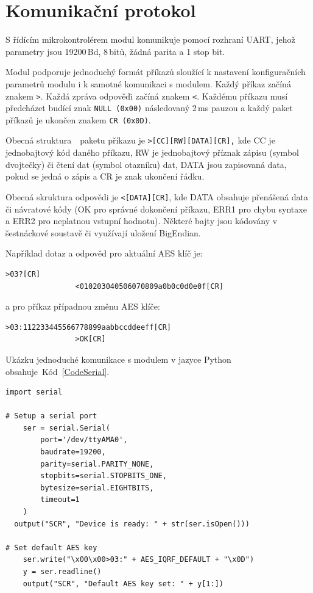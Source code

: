 \section{Komunikační protokol}

S řídícím mikrokontrolérem modul komunikuje pomocí rozhraní UART, jehož parametry jsou 19200\,Bd, 8\,bitů, žádná parita a 1 stop bit.
		
Modul podporuje jednoduchý formát příkazů sloužící k nastavení konfiguračních parametrů modulu i k samotné komunikaci s modulem. Každý příkaz začíná znakem \texttt{\textgreater}. Každá zpráva odpověďi začíná znakem \texttt{\textless}. Každému příkazu musí předcházet budící znak \texttt{NULL (0x00)} následovaný 2\,ms pauzou a každý paket příkazů je ukončen znakem \texttt{CR (0x0D)}. 

Obecná struktura~\cite{ModulIQRF}~paketu příkazu je	\texttt{>[CC][RW][DATA][CR],} kde CC je jednobajtový kód daného příkazu, RW je jednobajtový příznak zápisu (symbol dvojtečky) či čtení dat (symbol otazníku) dat, DATA jsou zapisovaná data, pokud se jedná o zápis a CR je znak ukončení řádku.

Obecná skruktura odpovědi je \texttt{<[DATA][CR]}, kde DATA obsahuje přenášená data či návratové kódy (OK pro správné dokončení příkazu, ERR1 pro chybu syntaxe a ERR2 pro neplatnou vstupní hodnotu). Některé bajty jsou kódovány v šestnáckové soustavě či využívají uložení BigEndian.

Například dotaz a odpověd pro aktuální AES klíč je:
\label{KapitolaStazeniKlice}

\begin{lstlisting}[style=MyCodeBash]
				>03?[CR]
				<010203040506070809a0b0c0d0e0f[CR]  
\end{lstlisting}

a pro příkaz případnou změnu AES klíče:

\begin{lstlisting}[style=MyCodeBash]
				>03:112233445566778899aabbccddeeff[CR]
				>OK[CR]
\end{lstlisting}

Ukázku jednoduché komunikace s modulem v jazyce Python obsahuje~Kód~\ref{CodeSerial}.

\begin{lstlisting}[caption={Komunikace s modulem přes sériový port},captionpos=b,label=CodeSerial,style=MyCodePython]
import serial

# Setup a serial port
	ser = serial.Serial(
		port='/dev/ttyAMA0',
		baudrate=19200,
		parity=serial.PARITY_NONE,
		stopbits=serial.STOPBITS_ONE,
		bytesize=serial.EIGHTBITS,
		timeout=1
	)
  output("SCR", "Device is ready: " + str(ser.isOpen()))

# Set default AES key
	ser.write("\x00\x00>03:" + AES_IQRF_DEFAULT + "\x0D")
	y = ser.readline()
	output("SCR", "Default AES key set: " + y[1:])
\end{lstlisting}



